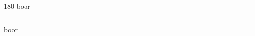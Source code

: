 
\begin{frame}
\begin{center}
\begin{turn}{180}
{\fontsize{2.5cm}{1em}\selectfont boor}
\end{turn}
\vspace{1em}\par  
\hrule
\vspace{1em}\par  
{\fontsize{2.5cm}{1em}\selectfont boor}
\end{center}
\end{frame}
